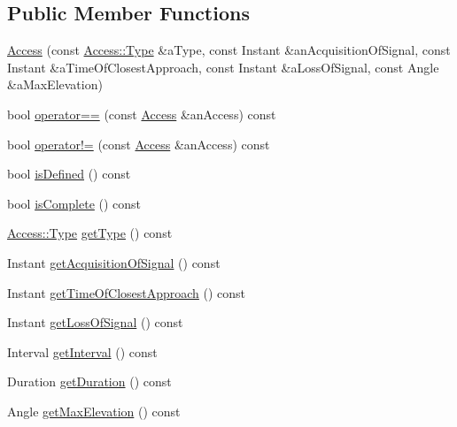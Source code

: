 \subsection*{Public Member Functions}
\begin{DoxyCompactItemize}
\item 
\hyperlink{classostk_1_1astro_1_1_access_a48ecec813c4e317da2613eef8b107193}{Access} (const \hyperlink{classostk_1_1astro_1_1_access_aac00b1a6ead7db92eba5b71e43235c93}{Access\+::\+Type} \&a\+Type, const Instant \&an\+Acquisition\+Of\+Signal, const Instant \&a\+Time\+Of\+Closest\+Approach, const Instant \&a\+Loss\+Of\+Signal, const Angle \&a\+Max\+Elevation)
\item 
bool \hyperlink{classostk_1_1astro_1_1_access_a4e336578930e1e1d49b7bdc279af4bdf}{operator==} (const \hyperlink{classostk_1_1astro_1_1_access}{Access} \&an\+Access) const
\item 
bool \hyperlink{classostk_1_1astro_1_1_access_a054593ffe0556b14c3eab0dd3ebcca56}{operator!=} (const \hyperlink{classostk_1_1astro_1_1_access}{Access} \&an\+Access) const
\item 
bool \hyperlink{classostk_1_1astro_1_1_access_adecb227a516bed14ad9f11b9b36ba48e}{is\+Defined} () const
\item 
bool \hyperlink{classostk_1_1astro_1_1_access_ae6bfc3c40d23545d9c520e44550c5033}{is\+Complete} () const
\item 
\hyperlink{classostk_1_1astro_1_1_access_aac00b1a6ead7db92eba5b71e43235c93}{Access\+::\+Type} \hyperlink{classostk_1_1astro_1_1_access_aa88d0d19a9386b9748f87263289195a2}{get\+Type} () const
\item 
Instant \hyperlink{classostk_1_1astro_1_1_access_a07b36c41b6ecceab9d841197e6e412d2}{get\+Acquisition\+Of\+Signal} () const
\item 
Instant \hyperlink{classostk_1_1astro_1_1_access_aa5be394928873c5795cfb068b1e5bfb6}{get\+Time\+Of\+Closest\+Approach} () const
\item 
Instant \hyperlink{classostk_1_1astro_1_1_access_ace680122654f24704fb6a40631b84afb}{get\+Loss\+Of\+Signal} () const
\item 
Interval \hyperlink{classostk_1_1astro_1_1_access_a44d8162ed0ea9bd599fe351639364ee0}{get\+Interval} () const
\item 
Duration \hyperlink{classostk_1_1astro_1_1_access_afb542654ea7603d54773e612be071bc2}{get\+Duration} () const
\item 
Angle \hyperlink{classostk_1_1astro_1_1_access_aa46499cf112a00ce3be12b4b8f23527c}{get\+Max\+Elevation} () const
\end{DoxyCompactItemize}
